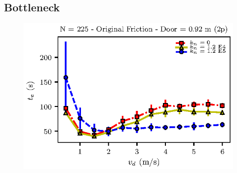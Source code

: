 \documentclass[preprint,12pt]{elsarticle}
\begin{document}
\subsection{\label{bottleneck} Bottleneck}


\begin{figure}[htbp!]
\centering
\includegraphics[width=0.7\columnwidth]
{./vd_vs_te_N225.eps}
\caption{\label{} }
\end{figure}
\end{document}
